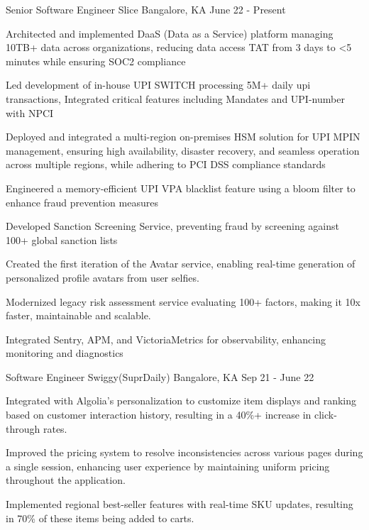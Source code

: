 \begin{cventries}
  \cventry
    {Senior Software Engineer}
    {Slice}
    {Bangalore, KA}
    {June 22 - Present}
    {
      \begin{cvitems}
        \item {Architected and implemented DaaS (Data as a Service) platform managing 10TB+ data across organizations,
        reducing data access TAT from 3 days to <5 minutes while ensuring SOC2 compliance}
        \item {Led development of in-house UPI SWITCH processing 5M+ daily upi transactions, Integrated critical features including Mandates and UPI-number with NPCI}
        \item {Deployed and integrated a multi-region on-premises HSM solution for UPI MPIN management, ensuring high availability,
        disaster recovery, and seamless operation across multiple regions, while adhering to PCI DSS compliance standards}
        \item {Engineered a memory-efficient UPI VPA blacklist feature using a bloom filter to enhance fraud prevention measures}
        \item {Developed Sanction Screening Service, preventing fraud by screening against 100+ global sanction lists}
        \item {Created the first iteration of the Avatar service, enabling real-time generation of personalized profile avatars from user selfies.}
        \item {Modernized legacy risk assessment service evaluating 100+ factors, making it 10x faster, maintainable and scalable.}
        \item {Integrated Sentry, APM, and VictoriaMetrics for observability, enhancing monitoring and diagnostics}
      \end{cvitems}
    }
  
  \cventry
    {Software Engineer}
    {Swiggy(SuprDaily)}
    {Bangalore, KA}
    {Sep 21 - June 22}
    {
      \begin{cvitems}
        \item {Integrated with Algolia's personalization to customize item displays and ranking based on customer interaction history, resulting in a 40\%+ increase in click-through rates.}
        \item {Improved the pricing system to resolve inconsistencies across various pages during a single session, enhancing user experience by maintaining uniform pricing throughout the application.}
        \item {Implemented regional best-seller features with real-time SKU updates, resulting in 70\% of these items being added to carts.}
      \end{cvitems}
    }
  

\end{cventries}
